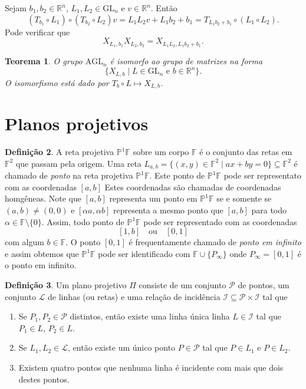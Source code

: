 \documentclass[12pt]{amsart}
\newcommand{\F}{\mathbb F}
\renewcommand{\L}{\mathbb L}
\newcommand{\R}{\mathbb R}
\newtheorem{theorem}{Teorema}
\theoremstyle{definition}
\newtheorem{definition}[theorem]{Definição}
\renewcommand{\P}{\mathcal P}
\renewcommand{\L}{\mathcal L}
\newcommand{\I}{\mathcal I}
\newcommand{\PP}{\mathbb P}
\newcommand{\agl}{\mbox{AGL}}
\begin{document}
Sejam $b_1,b_2\in \R^n$, $L_1,L_2\in \mbox{GL}_n$ e $v\in \R^n$. Então 
\[
    (T_{b_1}\circ L_1)\circ(T_{b_2}\circ L_2)v=
    L_1L_2v+L_1b_2+b_1=T_{L_1b_2+b_1}\circ (L_1\circ L_2).
\]
Pode verificar que 
\[
    X_{L_1,b_1}X_{L_2,b_2}=X_{L_1L_2,L_1b_2+b_1}.
\]

\begin{theorem}
    O grupo $\agl_n$ é isomorfo ao grupo de matrizes na forma 
    \[
        \{X_{L,b}\mid L\in\mbox{GL}_n\mbox{ e }b\in\R^n\}.
    \]
    O isomorfismo está dado por $T_b\circ L\mapsto X_{L,b}$. 
\end{theorem}



\section{Planos projetivos}

\begin{definition}
    A reta projetiva $\PP^1\F$ sobre um corpo $\F$ é o conjunto das retas em $\F^2$ que passam pela origem.
    Uma reta $L_{a,b}=\{(x,y)\in\F^2 \mid ax+by=0\}\subseteq \F^2$ é chamado de \emph{ponto} na reta projetiva $\PP^1\F$.
    Este ponto de $\PP^1\F$ pode ser representato com as coordenadas $[a,b]$ Estes coordenadas são 
    chamadas de coordenadas homgêneas. Note que $[a,b]$ representa um ponto em $\PP^1\F$ se e somente se 
    $(a,b)\neq (0,0)$ e $[\alpha a,\alpha b]$ representa a mesmo ponto que $[a,b]$ 
    para todo $\alpha\in\F\setminus\{0\}$. Assim, todo ponto de $\PP^1\F$ pode ser representado com as coordenadas 
    \[
        [1,b]\quad\mbox{ou}\quad [0,1]
    \]
    com algum $b\in \F$. O ponto $[0,1]$ é frequentamente chamado de \emph{ponto em infinito} e assim obtemos que $\PP^1\F$ pode ser identificado com $\F\cup\{P_\infty\}$ onde $P_\infty=[0,1]$ é o ponto em infinito.
\end{definition}

\begin{definition}
    Um plano projetivo $\Pi$ consiste de um conjunto $\P$ de pontos, um conjunto $\L$ de linhas (ou retas) e uma relação de incidência $\I\subseteq \P\times \I$ tal que 
    \begin{enumerate}
        \item Se $P_1,P_2\in \P$ distintos, então existe uma linha única linha $L \in \I$ tal que 
        $P_1\in L$, $P_2\in L$.
        \item Se $L_1,L_2\in \L$, então existe um único ponto $P\in \P$ tal que $P\in L_1$ e $P\in L_2$.
        \item Existem quatro pontos que nenhuma linha é incidente com mais que dois destes pontos.
    \end{enumerate}
\end{definition}
\end{document}
